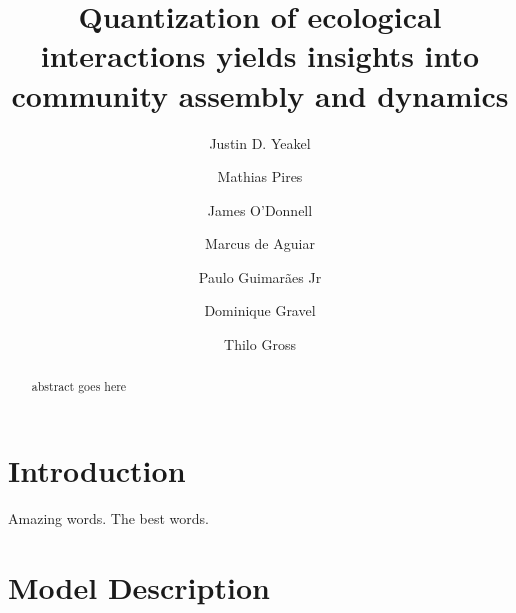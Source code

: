 \documentclass[twocolumn,preprintnumbers,amsmath,amssymb,superscriptaddress]{revtex4}
\begin{document}
\author{Justin D. Yeakel} 

\author{Mathias Pires} \affiliation{}

\author{James O'Donnell} \affiliation{}

\author{Marcus de Aguiar} \affiliation{}

\author{Paulo Guimar\~aes Jr} \affiliation{}

\author{Dominique Gravel} \affiliation{}

\author{Thilo Gross} \affiliation{}

\title{Quantization of ecological interactions yields insights into community assembly and dynamics}


\begin{abstract}
abstract goes here
\end{abstract}

\maketitle

\section*{Introduction}

Amazing words. The best words.



\section*{Model Description}
\end{document}
